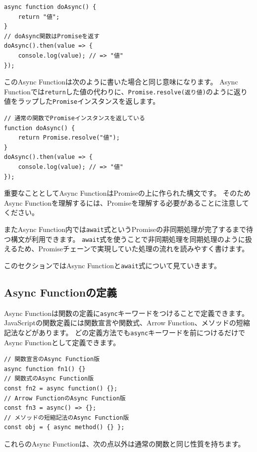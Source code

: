 \begin{lstlisting}
async function doAsync() {
    return "値";
}
// doAsync関数はPromiseを返す
doAsync().then(value => {
    console.log(value); // => "値"
});
\end{lstlisting}

このAsync Functionは次のように書いた場合と同じ意味になります。 Async
Functionでは\texttt{return}した値の代わりに、\texttt{Promise.resolve(返り値)}のように返り値をラップした\texttt{Promise}インスタンスを返します。

\begin{lstlisting}
// 通常の関数でPromiseインスタンスを返している
function doAsync() {
    return Promise.resolve("値");
}
doAsync().then(value => {
    console.log(value); // => "値"
});
\end{lstlisting}

重要なこととしてAsync FunctionはPromiseの上に作られた構文です。
そのためAsync
Functionを理解するには、Promiseを理解する必要があることに注意してください。

またAsync
Function内では\texttt{await}式というPromiseの非同期処理が完了するまで待つ構文が利用できます。
\texttt{await}式を使うことで非同期処理を同期処理のように扱えるため、Promiseチェーンで実現していた処理の流れを読みやすく書けます。

このセクションではAsync
Functionと\texttt{await}式について見ていきます。

\hypertarget{declare-async-function}{%
\subsection{Async Functionの定義}\label{declare-async-function}}

Async
Functionは関数の定義に\texttt{async}キーワードをつけることで定義できます。
JavaScriptの関数定義には関数宣言や関数式、Arrow
Function、メソッドの短縮記法などがあります。
どの定義方法でも\texttt{async}キーワードを前につけるだけでAsync
Functionとして定義できます。

\begin{lstlisting}
// 関数宣言のAsync Function版
async function fn1() {}
// 関数式のAsync Function版
const fn2 = async function() {};
// Arrow FunctionのAsync Function版
const fn3 = async() => {};
// メソッドの短縮記法のAsync Function版
const obj = { async method() {} };
\end{lstlisting}

これらのAsync Functionは、次の点以外は通常の関数と同じ性質を持ちます。

